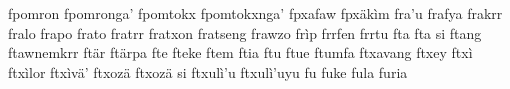 \documentclass[a4paper]{article}
\begin{document}
fpomron\hspace{2mm}
fpomronga'\hspace{2mm}
fpomtokx\hspace{2mm}
fpomtokxnga'\hspace{2mm}
fpxafaw\hspace{2mm}
fpxäkìm\hspace{2mm}
fra'u\hspace{2mm}
frafya\hspace{2mm}
frakrr\hspace{2mm}
fralo\hspace{2mm}
frapo\hspace{2mm}
frato\hspace{2mm}
fratrr\hspace{2mm}
fratxon\hspace{2mm}
fratseng\hspace{2mm}
frawzo\hspace{2mm}
frìp\hspace{2mm}
frrfen\hspace{2mm}
frrtu\hspace{2mm}
fta\hspace{2mm}
fta si\hspace{2mm}
ftang\hspace{2mm}
ftawnemkrr\hspace{2mm}
ftär\hspace{2mm}
ftärpa\hspace{2mm}
fte\hspace{2mm}
fteke\hspace{2mm}
ftem\hspace{2mm}
ftia\hspace{2mm}
ftu\hspace{2mm}
ftue\hspace{2mm}
ftumfa\hspace{2mm}
ftxavang\hspace{2mm}
ftxey\hspace{2mm}
ftxì\hspace{2mm}
ftxìlor\hspace{2mm}
ftxìvä'\hspace{2mm}
ftxozä\hspace{2mm}
ftxozä si\hspace{2mm}
ftxulì'u\hspace{2mm}
ftxulì'uyu\hspace{2mm}
fu\hspace{2mm}
fuke\hspace{2mm}
fula\hspace{2mm}
furia\hspace{2mm}
\end{document}
